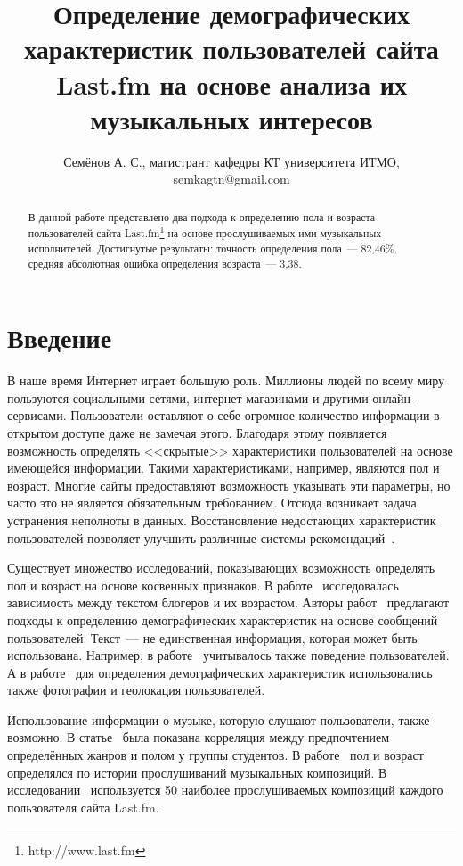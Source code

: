 \documentclass{spisok-article}
\title{Определение демографических характеристик пользователей
  сайта Last.fm на основе анализа их музыкальных интересов
}
\author{Семёнов А. С., магистрант кафедры КТ университета ИТМО,
  semkagtn@gmail.com
}
\newcommand{\bestGender}{82,46\%}
\newcommand{\bestAge}{3,38}
\begin{document}
\maketitle

\begin{abstract}
В данной работе представлено два подхода к определению пола и
возраста пользователей сайта Last.fm\footnote{http://www.last.fm}
на основе прослушиваемых ими музыкальных исполнителей.
Достигнутые результаты: точность определения пола~--- \bestGender,
средняя абсолютная ошибка определения возраста~--- \bestAge.
\end{abstract}


\section{Введение}

В наше время Интернет играет большую роль. Миллионы людей
по всему миру пользуются социальными сетями, интернет-магазинами
и другими онлайн-сервисами. Пользователи оставляют о себе
огромное количество информации в открытом доступе даже 
не замечая этого. Благодаря этому появляется возможность
определять <<скрытые>> характеристики пользователей на основе
имеющейся информации. Такими характеристиками, например, 
являются пол и возраст. Многие сайты предоставляют возможность 
указывать эти параметры, но часто это не является обязательным
требованием. Отсюда возникает задача устранения неполноты в 
данных. Восстановление недостающих характеристик пользователей 
позволяет улучшить различные системы
рекомендаций~\cite{recommender2001,recommender2005}.

Существует множество исследований, показывающих возможность 
определять пол и возраст на основе косвенных признаков.
В работе~\cite{burger2006} исследовалась зависимость 
между текстом блогеров и их возрастом.
Авторы работ~\cite{peersman2011,turdakov2013,schwartz2013} 
предлагают подходы к определению демографических характеристик 
на основе сообщений пользователей. Текст~--- не единственная
информация, которая может быть использована. Например, в
работе~\cite{rosenthal2011} учитывалось также
поведение пользователей. А в работе~\cite{farseev2015}
для определения демографических характеристик использовались
также фотографии и геолокация пользователей.

Использование информации о музыке, которую слушают пользователи, 
также возможно. В статье~\cite{christenson1988} была показана
корреляция между предпочтением определённых жанров и полом у
группы студентов. В работе~\cite{liu2012} пол и возраст определялся
по истории прослушиваний музыкальных композиций.
В исследовании~\cite{wu2014} используется 50 наиболее
прослушиваемых композиций каждого пользователя сайта Last.fm.
\end{document}
